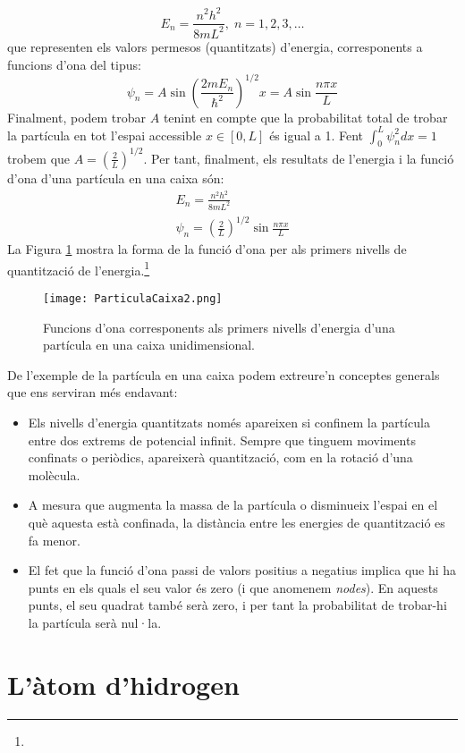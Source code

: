 \begin{mdframed}[backgroundcolor=gray!30,frametitle=Partícula en una caixa]
\[
E_n=\frac{n^2h^2}{8mL^2}, \; n=1,2,3,\ldots
\]
que representen els valors permesos (quantitzats) d'energia, corresponents a funcions d'ona del tipus:
\[
\psi_n=A \sin{\left( \frac{2mE_n}{\hbar^2}\right)^{1/2} x}=A \sin{\frac{n\pi x}{L}}
\]
Finalment, podem trobar $A$ tenint en compte que la probabilitat total de trobar la partícula en tot l'espai accessible $x\in [0,L]$ és igual a 1. Fent $\int_0^L \psi^2_n dx =1$ trobem que $A=\left( \frac{2}{L} \right)^{1/2}$. Per tant, finalment, els resultats de l'energia i la funció d'ona d'una partícula en una caixa són:
\begin{eqnarray}
E_n=\frac{n^2h^2}{8mL^2}\\
\psi_n= \left( \frac{2}{L} \right)^{1/2} \sin{\frac{n\pi x}{L}}
\end{eqnarray}
La Figura \ref{fig:ParticulaCaixa2} mostra la forma de la funció d'ona per als primers nivells de quantització de l'energia.\footnote{}
\end{mdframed}
\begin{figure}[h]
\centering
\texttt{[image: ParticulaCaixa2.png]}
\caption{Funcions d'ona corresponents als primers nivells d'energia d'una partícula en una caixa unidimensional.}
\label{fig:ParticulaCaixa2}
\end{figure}
De l'exemple de la partícula en una caixa podem extreure'n conceptes generals que ens serviran més endavant:
\begin{itemize}
\item Els nivells d'energia quantitzats només apareixen si confinem la partícula entre dos extrems de potencial infinit. Sempre que tinguem moviments confinats o periòdics, apareixerà quantització, com en la rotació d'una molècula.
\item A mesura que augmenta la massa de la partícula o disminueix l'espai en el què aquesta està confinada, la distància entre les energies de quantització es fa menor.
\item El fet que la funció d'ona passi de valors positius a negatius implica que hi ha punts en els quals el seu valor és zero (i que anomenem \textit{nodes}). En aquests punts, el seu quadrat també serà zero, i per tant la probabilitat de trobar-hi la partícula serà nul·la.
\end{itemize}
\section{L'àtom d'hidrogen}

